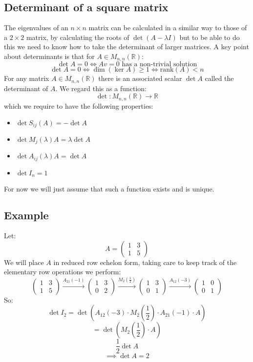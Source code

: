 \documentclass[12pt]{article}
\begin{document}
\subsection*{Determinant of a square matrix}
The eigenvalues of an \(n\times n\) matrix can be calculated in a similar way to those of a \(2\times 2\) matrix, by calculating the roots of \(\det{(A-\lambda I)}\) but to be able to do this we need to know how to take the determinant of larger matrices. A key point about determinants is that for \(A\in M_{n,n}(\mathbb{R})\):
\[\det A=0\iff Av=0 \text{ has a non-trivial solution}\]
\[\det A=0 \iff \dim(\ker A)\geq 1 \iff \text{rank}(A)<n\]
For any matrix \(A\in M_{n,n}(\mathbb{R})\) there is an associated scalar \(\det A\) called the determinant of \(A\). We regard this as a function:
\[\det :M_{n,n}(\mathbb{R})\to \mathbb{R}\]
which we require to have the following properties:
\begin{itemize}
    \item \(\det S_{ij}(A)=-\det A\)
    \item \(\det M_j(\lambda)A=\lambda \det A\)
    \item \(\det A_{ij}(\lambda)A=\det A\)
    \item \(\det I_n=1\)
\end{itemize}
For now we will just assume that such a function exists and is unique.
\subsection*{Example}
Let:
\[A=\begin{pmatrix}
    1 & 3 \\
    1 & 5
\end{pmatrix}\]
We will place \(A\) in reduced row echelon form, taking care to keep track of the elementary row operations we perform:
\[\begin{pmatrix}
    1 & 3 \\
    1 & 5
\end{pmatrix}\overset{A_{21}(-1)}{\longrightarrow}\begin{pmatrix}
    1 & 3 \\
    0 & 2
\end{pmatrix}\overset{M_2(\frac{1}{2})}{\longrightarrow}\begin{pmatrix}
    1 & 3 \\
    0 & 1
\end{pmatrix}\overset{A_{12}(-3)}{\longrightarrow}\begin{pmatrix}
    1 & 0 \\
    0 & 1
\end{pmatrix}\]
So:
\[\det I_2=\det(A_{12}(-3)\cdot M_2(\frac{1}{2})\cdot A_{21}(-1)\cdot A)\]
\[=\det(M_2(\frac{1}{2})\cdot A)\]
\[\frac{1}{2}\det A\]
\[\implies \det A=2\]
\end{document}
